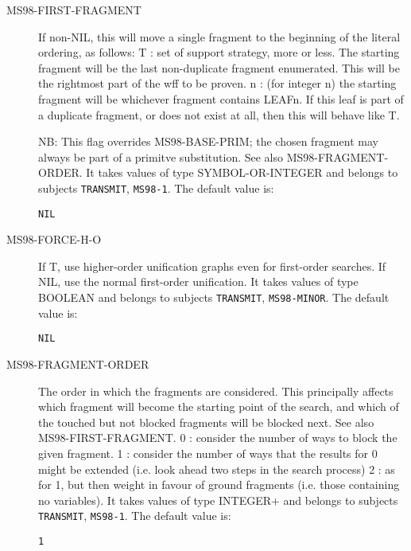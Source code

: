 \begin{description}
\item[MS98-FIRST-FRAGMENT]  
If non-NIL, this will move a single fragment to the
beginning of the literal ordering, as follows:
T : set of support strategy, more or less. The starting 
    fragment will be the last non-duplicate fragment 
    enumerated. This will be the rightmost part of the wff
    to be proven.
n : (for integer n) the starting fragment will be whichever
    fragment contains LEAFn. If this leaf is part of a duplicate
    fragment, or does not exist at all, then this will behave
    like T.

NB: This flag overrides MS98-BASE-PRIM; the chosen fragment may
always be part of a primitve substitution. 
See also MS98-FRAGMENT-ORDER.
It takes values of type SYMBOL-OR-INTEGER and belongs to subjects \texttt{TRANSMIT}, \texttt{MS98-1}.  The default value is: \begin{lstlisting}
NIL
\end{lstlisting}

\item[MS98-FORCE-H-O]  
If T, use higher-order unification graphs even for 
first-order searches. If NIL, use the normal first-order
unification.
It takes values of type BOOLEAN and belongs to subjects \texttt{TRANSMIT}, \texttt{MS98-MINOR}.  The default value is: \begin{lstlisting}
NIL
\end{lstlisting}

\item[MS98-FRAGMENT-ORDER]  
The order in which the fragments are considered. This
principally affects which fragment will become the starting 
point of the search, and which of the touched but not blocked
fragments will be blocked next. See also MS98-FIRST-FRAGMENT.
0 : consider the number of ways to block the given fragment.
1 : consider the number of ways that the results for 0 might be
    extended (i.e. look ahead two steps in the search process)
2 : as for 1, but then weight in favour of ground fragments
    (i.e. those containing no variables).
It takes values of type INTEGER+ and belongs to subjects \texttt{TRANSMIT}, \texttt{MS98-1}.  The default value is: \begin{lstlisting}
1
\end{lstlisting}


\end{description}
